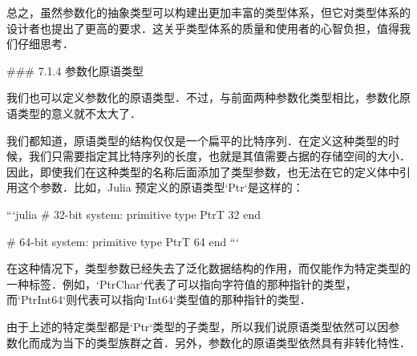 总之，虽然参数化的抽象类型可以构建出更加丰富的类型体系，但它对类型体系的设计者也提出了更高的要求．这关乎类型体系的质量和使用者的心智负担，值得我们仔细思考．

### 7.1.4 参数化原语类型

我们也可以定义参数化的原语类型．不过，与前面两种参数化类型相比，参数化原语类型的意义就不太大了．

我们都知道，原语类型的结构仅仅是一个扁平的比特序列．在定义这种类型的时候，我们只需要指定其比特序列的长度，也就是其值需要占据的存储空间的大小．因此，即使我们在这种类型的名称后面添加了类型参数，也无法在它的定义体中引用这个参数．比如，Julia 预定义的原语类型`Ptr`是这样的：

```julia
# 32-bit system:
primitive type Ptr{T} 32 end

# 64-bit system:
primitive type Ptr{T} 64 end
```

在这种情况下，类型参数已经失去了泛化数据结构的作用，而仅能作为特定类型的一种标签．例如，`Ptr{Char}`代表了可以指向字符值的那种指针的类型，而`Ptr{Int64}`则代表可以指向`Int64`类型值的那种指针的类型．

由于上述的特定类型都是`Ptr`类型的子类型，所以我们说原语类型依然可以因参数化而成为当下的类型族群之首．另外，参数化的原语类型依然具有非转化特性．
